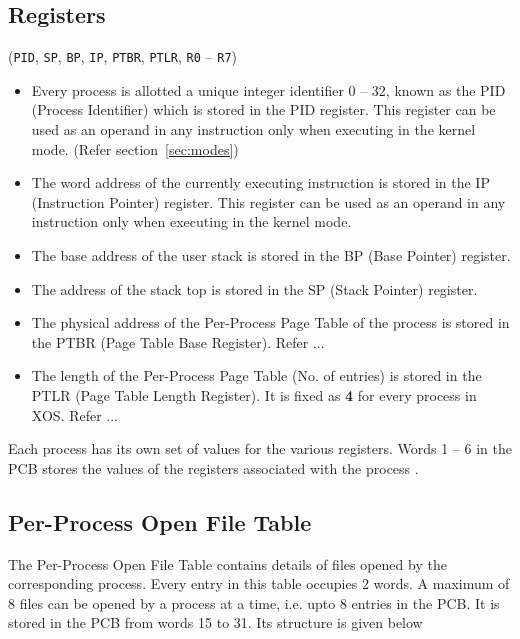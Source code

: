 \documentclass[11pt]{report}
\begin{document}
	  \subsection{Registers} (\texttt{PID}, \texttt{SP}, \texttt{BP}, \texttt{IP}, \texttt{PTBR}, \texttt{PTLR}, \texttt{R0} -- \texttt{R7}) \\ 
\begin{itemize}
	\item Every process is allotted a unique integer identifier 0 -- 32, known as the PID (Process Identifier) which is stored in the PID register. This register can be used as an operand in any instruction only when executing in the kernel mode. (Refer section~\ref{sec:modes})
	
	\item The word address of the currently executing instruction is stored in the IP (Instruction Pointer) register. This register can be used as an operand in any instruction only when executing in the kernel mode.
	\item The base address of the user stack is stored in the BP (Base Pointer) register. 
	\item The address of the stack top is stored in the SP (Stack Pointer) register. 
	\item The physical address of the Per-Process Page Table of the process is stored in the PTBR (Page Table Base Register). Refer ...
	\item The length of the Per-Process Page Table (No. of entries) is stored in the PTLR (Page Table Length Register). It is fixed as \textbf{4} for every process in XOS. Refer ... 
	
\end{itemize}
Each process has its own set of values for the various registers. Words  1 -- 6 in the PCB stores the values of the registers associated with the process .
	
\subsection{Per-Process Open File Table} 
	 
	  The Per-Process Open File Table contains details of files opened by the corresponding process. Every entry in this table occupies 2 words. A maximum of 8 files can be opened by a process at a time, i.e. upto 8 entries in the PCB. It is stored in the PCB from words 15 to 31. Its structure is given below
\end{document}
